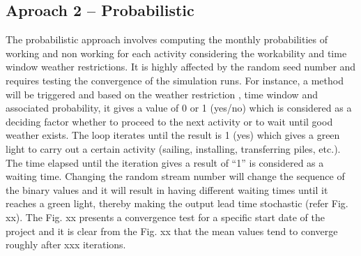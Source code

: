 \subsection{Aproach 2 -- Probabilistic}
The probabilistic approach involves computing the monthly probabilities of working and non working for each activity considering the workability and time window weather restrictions. It is highly affected by the random seed number and requires testing the convergence of the simulation runs. 
For instance, a method will be triggered and based on the weather restriction , time window and associated probability, it gives a value of 0 or 1 (yes/no) which is considered as a deciding factor whether to proceed to the next activity or to wait until good weather exists. The loop iterates until the result is 1 (yes) which gives a green light to carry out a certain activity (sailing, installing, transferring piles, etc.). The time elapsed until the iteration gives a result of “1” is considered as a waiting time. Changing the random stream number will change the sequence of the binary values and it will result in having different waiting times until it reaches a green light, thereby making the output lead time stochastic (refer Fig. xx). The Fig. xx presents a convergence test for a specific start date of the project and it is clear from the Fig. xx that the mean values tend to converge roughly after xxx iterations.